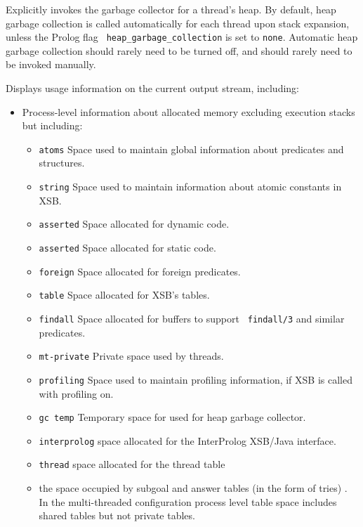 \begin{description}
%
Explicitly invokes the garbage collector for a thread's heap. By
default, heap garbage collection is called automatically for each
thread upon stack expansion, unless the Prolog flag {\tt
  heap\_garbage\_collection} is set to {\tt none}.  Automatic heap
garbage collection should rarely need to be turned off, and should
rarely need to be invoked manually.

\comment{
}

%
Displays usage information on the current output stream, including: 
\begin{itemize} 
\item Process-level information about allocated memory excluding
  execution stacks but including: 
\begin{itemize}
\item {\tt atoms} Space used to maintain global information about
  predicates and structures. 
%
\item {\tt string} Space used to maintain information about atomic
  constants in XSB.
%
\item {\tt asserted} Space allocated for dynamic code.
%
\item {\tt asserted} Space allocated for static code.
%
\item {\tt foreign} Space allocated for foreign predicates.
%
\item {\tt table} Space allocated for XSB's tables.
%
\item {\tt findall} Space allocated for buffers to support {\tt
  findall/3} and similar predicates.
%
\item {\tt mt-private} Private space used by threads.
%
\item {\tt profiling} Space used to maintain profiling information, if
  XSB is called with profiling on.
%
\item {\tt gc temp} Temporary space for used for heap garbage
  collector.
%
\item {\tt interprolog} space allocated for the InterProlog XSB/Java
  interface.
%
\item {\tt thread} space allocated for the thread table
%
\item the space occupied by subgoal and answer tables (in the form of
  tries) \cite{RRSSW98,CuSW99b,TST99}.  In the multi-threaded
  configuration process level table space includes shared tables but
  not private tables.
\end{itemize}


\end{itemize}
\end{description}
